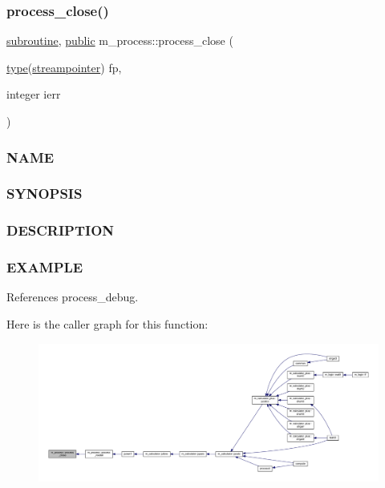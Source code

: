 \subsubsection{\texorpdfstring{process\+\_\+close()}{process\_close()}}
{\footnotesize\ttfamily \hyperlink{M__stopwatch_83_8txt_acfbcff50169d691ff02d4a123ed70482}{subroutine}, \hyperlink{M__stopwatch_83_8txt_a2f74811300c361e53b430611a7d1769f}{public} m\+\_\+process\+::process\+\_\+close (\begin{DoxyParamCaption}\item[{\hyperlink{stop__watch_83_8txt_a70f0ead91c32e25323c03265aa302c1c}{type}(\hyperlink{structm__process_1_1streampointer}{streampointer})}]{fp,  }\item[{integer}]{ierr }\end{DoxyParamCaption})}



\subsubsection*{N\+A\+ME}

\subsubsection*{S\+Y\+N\+O\+P\+S\+IS}

\subsubsection*{D\+E\+S\+C\+R\+I\+P\+T\+I\+ON}

\subsubsection*{E\+X\+A\+M\+P\+LE}

References process\+\_\+debug.

Here is the caller graph for this function\+:
\nopagebreak
\begin{figure}[H]
\begin{center}
\leavevmode
\includegraphics[width=350pt]{namespacem__process_ab4c5cad3fb46686f0c9b71c3a634f6ae_icgraph}
\end{center}
\end{figure}
\mbox{\label{namespacem__process_a3c0f543a9ceff2671041d73660f60a59}} 
